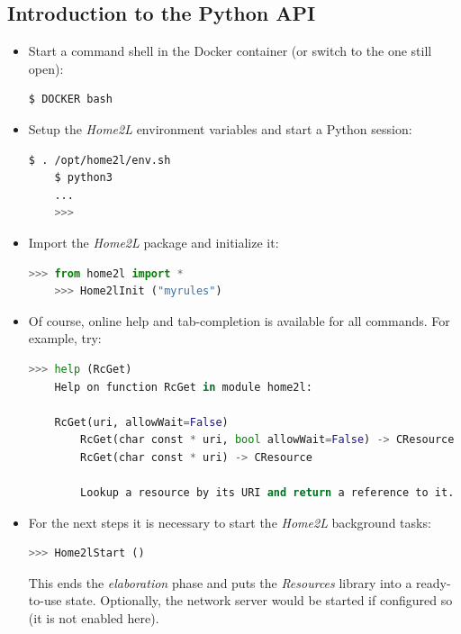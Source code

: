 \documentclass[12pt,english,parskip=half,headheight=19pt]{scrreprt}
\begin{document}
\subsection{Introduction to the Python API}
\label{sec:tutorial-rules-python}


\begin{itemize}[$\blacktriangleright$]

\item
  Start a command shell in the Docker container (or switch to the one still open):
  \begin{lstlisting}[language=bash]
    $ DOCKER bash
  \end{lstlisting}

\item
  Setup the \textit{Home2L} environment variables and start a Python session:
  \begin{lstlisting}[language=bash]
    $ . /opt/home2l/env.sh
    $ python3
    ...
    >>>
  \end{lstlisting}

\item
  Import the \textit{Home2L} package and initialize it:
  \begin{lstlisting}[language=python]
    >>> from home2l import *
    >>> Home2lInit ("myrules")
  \end{lstlisting}

\item
  Of course, online help and tab-completion is available for all commands. For example, try:
  \begin{lstlisting}[language=python]
    >>> help (RcGet)
    Help on function RcGet in module home2l:

    RcGet(uri, allowWait=False)
        RcGet(char const * uri, bool allowWait=False) -> CResource
        RcGet(char const * uri) -> CResource

        Lookup a resource by its URI and return a reference to it.
  \end{lstlisting}

\item
  For the next steps it is necessary to start the \textit{Home2L} background tasks:
  \begin{lstlisting}[language=python]
    >>> Home2lStart ()
  \end{lstlisting}
  This ends the \textit{elaboration} phase and puts the \textit{Resources} library into a ready-to-use state.
  Optionally, the network server would be started if configured so (it is not enabled here).


\end{itemize}
\end{document}
